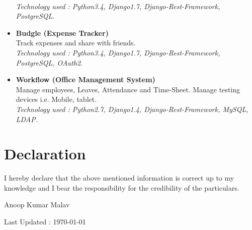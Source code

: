 \documentclass[11pt]{article}
\begin{document}
\begin{itemize}
    \\ \textit{Technology used : Python3.4, Django1.7, Django-Rest-Framework, PostgreSQL.}
 \item \textbf{Budgle (Expense Tracker)}
    \\ Track expenses and share with friends.
    \\ \textit{Technology used : Python3.4, Django1.7, Django-Rest-Framework, PostgreSQL, OAuth2.}
 \item \textbf{Workflow (Office Management System)}
    \\ Manage employees, Leaves, Attendance and Time-Sheet. Manage testing devices i.e. Mobile, tablet.
    \\ \textit{Technology used : Python2.7, Django1.4, Django-Rest-Framework, MySQL, LDAP.}
\end{itemize}


\section*{Declaration}
I hereby declare that the above mentioned information is correct up to
my knowledge and I bear the responsibility for the credibility of the particulars.\\
\begin{flushright}
 Anoop Kumar Malav
\end{flushright}
\begin{center}

Last Updated : \today

\end{center}
\end{document}
